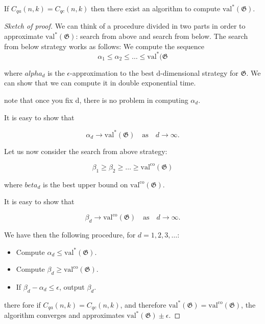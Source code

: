 \begin{theorem}
If $C_{q a}(n, k) = C_{q c}(n, k)$ then there exist an algorithm to compute $\operatorname{val^{*}}(\mathfrak{G})$.
\end{theorem}
\begin{proof}[Sketch of proof]
We can think of a procedure divided in two parts in order to approximate $\operatorname{val^{*}}(\mathfrak{G})$: search from above and search from below.
The search from below strategy works as follows:
We compute the sequence 
\begin{equation}
\alpha_1 \leq \alpha_2 \leq \dots \leq \operatorname{val^{*}}(\mathfrak{G}
\end{equation}
 
where $alpha_d$ is the $\epsilon$-approximation to the best d-dimensional strategy for $\mathfrak{G}$. We can show that we can compute it in double exponential time.

note that once you fix d, there is no problem in computing $\alpha_d$.

It is easy to show that 

\begin{equation}
\alpha_d \rightarrow \operatorname{val^{*}}(\mathfrak{G}) \quad \text{as} \quad d \rightarrow \infty.
\end{equation}

Let us now consider the search from above strategy:

\begin{equation}
\beta_1 \geq \beta_2 \geq \dots \geq \operatorname{val^{co}}(\mathfrak{G})
\end{equation}

where $beta_d$ is the best upper bound on $\operatorname{val^{co}}(\mathfrak{G})$.

It is easy to show that 

\begin{equation}
\beta_d \rightarrow \operatorname{val^{co}}(\mathfrak{G}) \quad \text{as} \quad d \rightarrow \infty.
\end{equation}

We have then the following procedure, for $d = 1,2,3, \dots$:

\begin{itemize}
\item Compute $\alpha_d \leq \operatorname{val^{*}}(\mathfrak{G})$.
\item Compute $\beta_d \geq \operatorname{val^{co}}(\mathfrak{G})$.
\item If $\beta_d - \alpha_d \leq \epsilon$, output $\beta_d$.
\end{itemize}

there fore if $C_{q a}(n, k) = C_{q c}(n, k)$, and therefore $\operatorname{val^{*}}(\mathfrak{G}) =  \operatorname{val^{co}}(\mathfrak{G})$, the algorithm converges and approximates $\operatorname{val^{*}}(\mathfrak{G}) \pm \epsilon$.
\end{proof}


